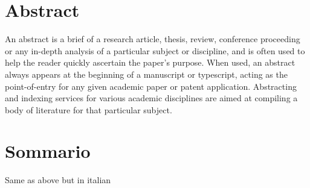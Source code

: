 
\begingroup
\let\clearpage\relax
\let\cleardoublepage\relax
\let\cleardoublepage\relax

\chapter*{Abstract}
An abstract is a brief of a research article, thesis, review,
conference proceeding or any in-depth analysis of a particular
subject or discipline, and is often used to help the reader
quickly ascertain the paper's purpose. When used, an abstract
always appears at the beginning of a manuscript or typescript,
acting as the point-of-entry for any given academic paper or
patent application. Abstracting and indexing services for various
academic disciplines are aimed at compiling a body of literature
for that particular subject.

\vfill
\newpage
{}
\chapter*{Sommario}
Same as above but in italian

\endgroup